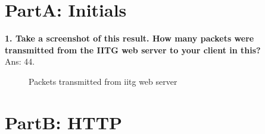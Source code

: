 \documentclass[11pt]{article}
\numberwithin{equation}{section}
\begin{document}



\renewcommand\contentsname{{\Huge Contents}\vspace{0.5cm}}
\cleardoublepage
{}
{}
\setcounter{tocdepth}{8}


\cleardoublepage
{}
\renewcommand\listfigurename{{\Huge List of Figures}\vspace{0.5cm}}

\pagebreak

\section*{PartA: Initials}

\textbf{1. Take a screenshot of this result. How many packets were transmitted from the IITG web server to your client in this? }\\
Ans: \textsc{44.}

\begin{figure}[H]
\begin{center}
		\centering
		\caption{ Packets transmitted from iitg web server}
		\label{fig:q1_f1_a}
\end{center}
\end{figure} 

\section*{PartB: HTTP} 
\end{document}
